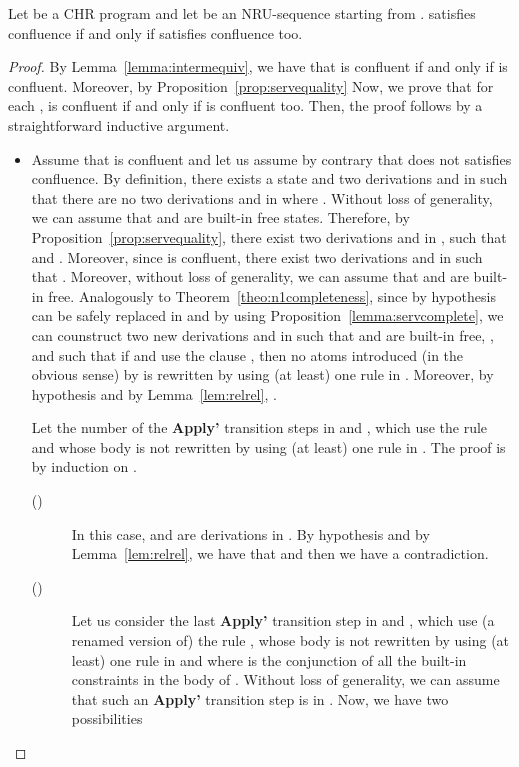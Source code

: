 \documentclass{tlp}
\begin{document}
\setcounter{theorem}{1}
\begin{theorem}[{\sc Confluence}] Let  be a CHR program and let 
be an NRU-sequence starting from .  satisfies confluence if and only if 
satisfies confluence too.
\end{theorem}\setcounter{theorem}{3}
\begin{proof}
By Lemma~\ref{lemma:intermequiv}, we have that  is confluent if and only if  is confluent.
Moreover, by Proposition~\ref{prop:servequality}
Now, we prove that
for each ,  is confluent if and only if  is confluent too.
Then, the proof follows by a straightforward inductive argument.
\begin{itemize}


  \item Assume that  is confluent and let us assume by contrary that  does not satisfies confluence.
  By definition,  there exists a state  and two derivations  and  in  such that
there are no two derivations  and  in   where
. Without loss of generality, we can assume that  and  are built-in free states.  Therefore, by Proposition~\ref{prop:servequality}, there exist
two derivations  and  in , such that  and . Moreover, since  is confluent, there exist two derivations  and  in  such that . Moreover, without loss of generality, we can assume that  and  are built-in free.
Analogously to Theorem~\ref{theo:n1completeness}, since by hypothesis
 can be safely replaced
in  and by using Proposition~\ref{lemma:servcomplete}, we can counstruct two new derivations
 and 
in  such that
 and  are built-in free,
,  and such that if  and  use the clause , then no atoms introduced (in the obvious sense) by  is rewritten by using (at least) one rule in .
Moreover, by hypothesis and by Lemma~\ref{lem:relrel}, .



Let  the number of the {\bf Apply'} transition steps in  and ,
which use the rule  and whose body is not rewritten by using (at least) one rule in .
The proof is by induction on .
\begin{description}
  \item[()] In this case,  and  are derivations in . By hypothesis  and by Lemma~\ref{lem:relrel}, we have that   and then we have a contradiction.

\item[()] Let us consider the last {\bf Apply'} transition step in  and , which use (a renamed version of) the rule , whose body is not rewritten by using (at least) one rule in  and where  is the conjunction of all the built-in constraints in the body of . Without loss of generality, we can assume that such an {\bf Apply'} transition step is in .
    Now, we have two possibilities


\end{description}
\end{itemize}
\end{proof}
\end{document}
